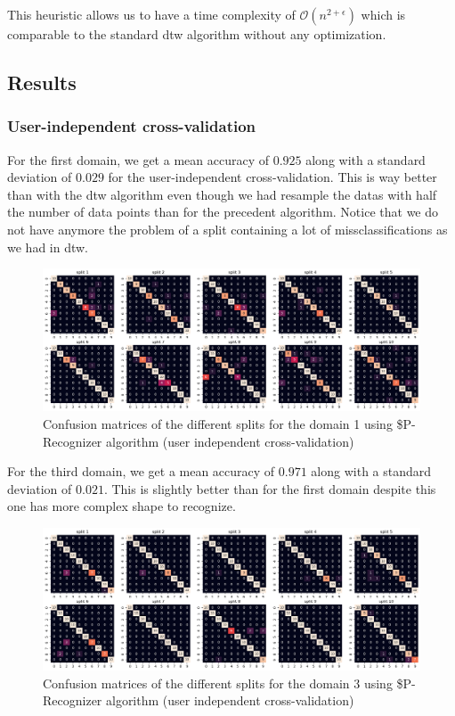 This heuristic allows us to have a time complexity of $\mathcal{O}(n^{2 + \epsilon})$ which is comparable to the standard dtw algorithm without any optimization.

\subsection{Results}

\subsubsection{User-independent cross-validation}

For the first domain, we get a mean accuracy of $0.925$ along with a standard deviation of $0.029$ for the user-independent cross-validation. This is way better than with the dtw algorithm even though we had resample the datas with half the number of data points than for the precedent algorithm. Notice that we do not have anymore the problem of a split containing a lot of missclassifications as we had in dtw.

\begin{figure}[H]
	\centering
	\includegraphics{figures/pcr/domain01/cm_pcr_d1_uindep.png}
	\caption{Confusion matrices of the different splits for the domain 1 using \$P-Recognizer algorithm (user independent cross-validation)}
	\label{fig:cm-pcr-d1-uindep}
\end{figure}

For the third domain, we get a mean accuracy of $0.971$ along with a standard deviation of $0.021$. This is slightly better than for the first domain despite this one has more complex shape to recognize.

\begin{figure}[H]
	\centering
	\includegraphics{figures/pcr/domain03/cm_pcr_d3_uindep.png}
	\caption{Confusion matrices of the different splits for the domain 3 using \$P-Recognizer algorithm (user independent cross-validation)}
	\label{fig:cm-pcr-d3-uindep}
\end{figure}

